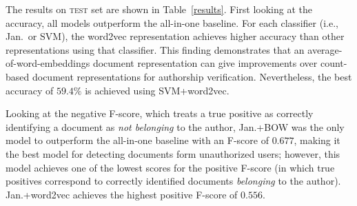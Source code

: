 \documentclass[11pt]{article}
\newcommand\test{\textsc{test}\xspace}
\begin{document}

The results on \test set are shown in Table~\ref{results}. First
looking at the accuracy, all models outperform the all-in-one
baseline. For each classifier (i.e., Jan.\ or SVM), the word2vec
representation achieves higher accuracy than other representations
using that classifier. This finding demonstrates
that an average-of-word-embeddings document representation can give
improvements over count-based document representations for authorship
verification. Nevertheless, the best accuracy of $59.4\%$ is
achieved using SVM+word2vec.

Looking at the negative F-score, which treats a true positive as
correctly identifying a document as \emph{not belonging} to the
author, Jan.+BOW was the only model to outperform the all-in-one
baseline with an F-score of $0.677$, making it the best model for
detecting documents form unauthorized users; however, this model
achieves one of the lowest scores for the positive F-score (in which
true positives correspond to correctly identified documents
\emph{belonging} to the author). Jan.+word2vec achieves the highest
positive F-score of $0.556$.
\end{document}
